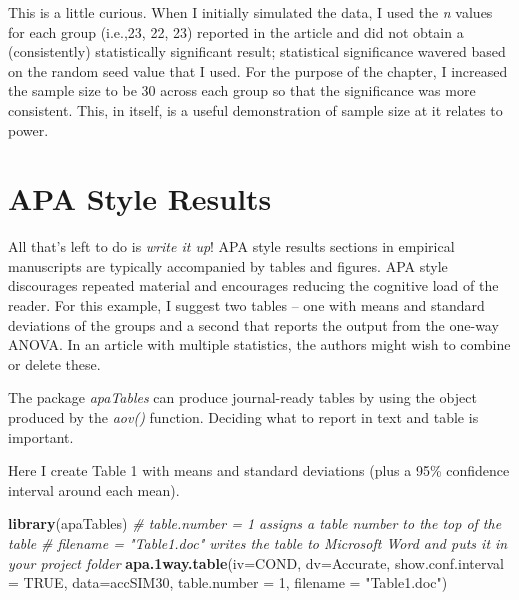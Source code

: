 \documentclass[
  english,
]{book}
\newenvironment{Shaded}{\begin{snugshade}}{\end{snugshade}}
\newcommand{\CommentTok}[1]{\textcolor[rgb]{0.56,0.35,0.01}{\textit{#1}}}
\newcommand{\DataTypeTok}[1]{\textcolor[rgb]{0.13,0.29,0.53}{#1}}
\newcommand{\DecValTok}[1]{\textcolor[rgb]{0.00,0.00,0.81}{#1}}
\newcommand{\KeywordTok}[1]{\textcolor[rgb]{0.13,0.29,0.53}{\textbf{#1}}}
\newcommand{\NormalTok}[1]{#1}
\newcommand{\OtherTok}[1]{\textcolor[rgb]{0.56,0.35,0.01}{#1}}
\newcommand{\StringTok}[1]{\textcolor[rgb]{0.31,0.60,0.02}{#1}}
\begin{document}
This is a little curious. When I initially simulated the data, I used the \emph{n} values for each group (i.e.,23, 22, 23) reported in the article \citep{tran_you_2014} and did not obtain a (consistently) statistically significant result; statistical significance wavered based on the random seed value that I used. For the purpose of the chapter, I increased the sample size to be 30 across each group so that the significance was more consistent. This, in itself, is a useful demonstration of sample size at it relates to power.

\hypertarget{apa-style-results}{%
\section{APA Style Results}\label{apa-style-results}}

All that's left to do is \emph{write it up}! APA style results sections in empirical manuscripts are typically accompanied by tables and figures. APA style discourages repeated material and encourages reducing the cognitive load of the reader. For this example, I suggest two tables -- one with means and standard deviations of the groups and a second that reports the output from the one-way ANOVA. In an article with multiple statistics, the authors might wish to combine or delete these.

The package \emph{apaTables} can produce journal-ready tables by using the object produced by the \emph{aov()} function. Deciding what to report in text and table is important.

Here I create Table 1 with means and standard deviations (plus a 95\% confidence interval around each mean).

\begin{Shaded}
\begin{Highlighting}[]
\KeywordTok{library}\NormalTok{(apaTables)}
\CommentTok{# table.number = 1 assigns a table number to the top of the table }
\CommentTok{# filename = "Table1.doc" writes the table to Microsoft Word and puts it in your project folder}
\KeywordTok{apa.1way.table}\NormalTok{(}\DataTypeTok{iv=}\NormalTok{COND, }\DataTypeTok{dv=}\NormalTok{Accurate, }\DataTypeTok{show.conf.interval =} \OtherTok{TRUE}\NormalTok{, }\DataTypeTok{data=}\NormalTok{accSIM30, }\DataTypeTok{table.number =} \DecValTok{1}\NormalTok{, }\DataTypeTok{filename =} \StringTok{"Table1.doc"}\NormalTok{)}
\end{Highlighting}
\end{Shaded}
\end{document}
